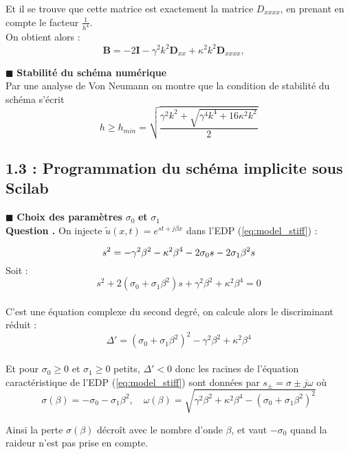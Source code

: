\documentclass[a4,12pt]{article}
\newcommand{\B}{\mathbf{B}}
\newcommand{\D}{\mathbf{D}}
\newcounter{Nbquestion}
\newcommand*\question{%
  \stepcounter{Nbquestion}%
  \textbf{Question \theNbquestion. }}
\begin{document}
	    Et il se trouve que cette matrice est exactement la matrice $D_{xxxx}$, en prenant en compte le facteur $\frac{1}{h^4}$.\\

	    On obtient alors :
	    $$ \B=-2\mathbf{I}-\gamma^2 k^2 \D_{xx}+\kappa^2 k^2\D_{xxxx}, \quad $$


	    \hspace{0.5cm} $\blacksquare$ \textbf{Stabilité du schéma numérique} \\

	    Par une analyse de Von Neumann on montre que la condition de stabilité du schéma s'écrit 
	    \[
	      h\geqslant h_{min}=\sqrt{\frac{\gamma^2k^2+\sqrt{\gamma^4 k^4+16\kappa^2 k^2}}{2}}
	    \]

	    \subsection*{1.3 : Programmation du schéma implicite sous Scilab}

	    \hspace{0.5cm} $\blacksquare$ \textbf{Choix des paramètres} $\sigma_0$  \textbf{et}  $\sigma_1$\\


	    \question On injecte $\tilde u(x,t)=e^{st+j\beta x}$ dans l'EDP (\ref{eq:model_stiff}) :

	    \[
	      s^2 = -\gamma^2 \beta^2 - \kappa^2 \beta^4 - 2 \sigma_0 s - 2 \sigma_1 \beta^2 s\\
	    \]
	    Soit :
	    \[
	      s^2 + 2(\sigma_0 + \sigma_1 \beta^2) s + \gamma^2 \beta^2 + \kappa^2 \beta^4 = 0
	    \]~\\
	    C'est une équation complexe du second degré, on calcule alors le discriminant réduit :
	    \[
	      \Delta' = (\sigma_0 + \sigma_1 \beta^2)^2 - \gamma^2 \beta^2 + \kappa^2 \beta^4
	    \]~\\
	    Et pour $\sigma_0\geqslant 0$ et $\sigma_1\geqslant 0$ petits, $\Delta' < 0$ donc les racines de l'équation caractéristique de l'EDP (\ref{eq:model_stiff}) sont données par $s_{\pm}=\sigma\pm j\omega$ où 
	    \[
	      \sigma(\beta)=-\sigma_0-\sigma_1\beta^2,\quad \omega(\beta)=\sqrt{\gamma^2 \beta^2+\kappa^2\beta^4-(\sigma_0+\sigma_1\beta^2)^2}
	    \]

	    Ainsi la perte $\sigma(\beta)$ décroît avec le nombre d'onde $\beta$, et vaut $-\sigma_0$ quand la raideur n'est pas prise en compte.\\
\end{document}
